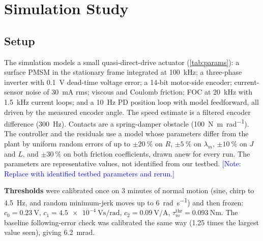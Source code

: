 \documentclass[conference]{IEEEtran}
\newcommand{\NOTE}[1]{\textcolor{blue}{[Note: #1]}}
\begin{document}
\section{Simulation Study}
\label{sec:sim}

\subsection{Setup}
The simulation models a small quasi-direct-drive actuator
(\cref{tab:params}): a surface PMSM in the stationary frame integrated at
\SI{100}{\kilo\hertz}; a three-phase inverter with \SI{0.1}{\volt}
dead-time voltage error; a 14-bit motor-side encoder; current-sensor noise
of \SI{30}{\milli\ampere} rms; viscous and Coulomb friction; FOC at
\SI{20}{\kilo\hertz} with \SI{1.5}{\kilo\hertz} current loops; and a
\SI{10}{\hertz} PD position loop with model feedforward, all driven by the
measured encoder angle. The speed estimate is a filtered encoder difference
(\SI{300}{\hertz}). Contacts are a spring-damper obstacle
(\SI{100}{\newton\metre\per\radian}). The controller and the residuals use a
model whose parameters differ from the plant by uniform random errors of up to
$\pm\SI{20}{\percent}$ on $R$, $\pm\SI{5}{\percent}$ on $\lambda_m$,
$\pm\SI{10}{\percent}$ on $J$ and $L$, and $\pm\SI{30}{\percent}$ on both
friction coefficients, drawn anew for every run. The parameters are
representative values, not identified from our testbed.
\NOTE{Replace with identified testbed parameters and rerun.}

\textbf{Thresholds} were calibrated once on 3 minutes of normal motion (sine,
chirp to \SI{4.5}{\hertz}, and random minimum-jerk moves up to
\SI{6}{\radian\per\second}) and then frozen: $c_0=\SI{0.23}{\volt}$,
$c_1=\SI{4.5e-4}{\volt\second\per\radian}$, $c_2=\SI{0.09}{\volt\per\ampere}$,
$\tau_m^\mathrm{thr}=\SI{0.093}{\newton\metre}$. The baseline following-error
check was calibrated the same way (1.25 times the largest value seen),
giving \SI{6.2}{\milli\radian}.
\end{document}
